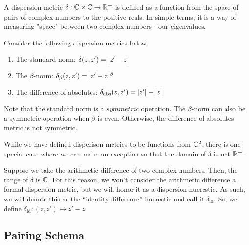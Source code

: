 \begin{definition}
A dispersion metric $\delta: \mathbb{C} \times \mathbb{C} \to \mathbb{R}^+$ is defined as a function from the space of pairs of complex numbers to the positive reals. In simple terms, it is a way of measuring "space" between two complex numbers - our eigenvalues.
\end{definition}

Consider the following dispersion metrics below.

\begin{enumerate}
\item The standard norm: $\delta(z,z') = |z' - z|$
\item The $\beta$-norm: $\delta_\beta(z,z') = |z' - z|^\beta$
\item The difference of absolutes: $\delta_{\text{abs}}(z,z') = |z'| - |z|$
\end{enumerate}

\begin{remark}
Note that the standard norm is a $\textit{symmetric}$ operation. The $\beta$-norm can also be a symmetric operation when $\beta$ is even. Otherwise, the difference of absolutes metric is not symmetric.
\end{remark}

While we have defined disperison metrics to be functions from $\mathbb{C}^2$, there is one special case where we can make an exception so that the domain of $\delta$ is not $\mathbb{R}^+$. 

\begin{remark}
Suppose we take the arithmetic difference of two complex numbers. Then, the range of $\delta$ is $\mathbb{C}$. For this reason, we won't consider the arithmetic difference a formal dispersion metric, but we will honor it as a dispersion huerestic. As such, we will denote this as the ``identity difference'' huerestic and call it $\delta_{\text{id}}$. So, we define $\delta_{\text{id}}: (z, z') \mapsto z' - z$
\end{remark}



\subsection{Pairing Schema}


